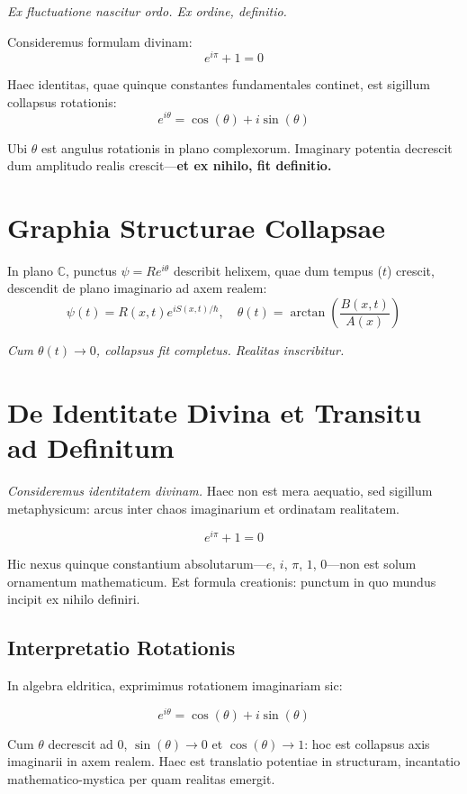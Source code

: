 \textit{Ex fluctuatione nascitur ordo. Ex ordine, definitio.}

Consideremus formulam divinam:
\[
e^{i\pi} + 1 = 0
\]

Haec identitas, quae quinque constantes fundamentales continet, est sigillum collapsus rotationis:  
\[
e^{i\theta} = \cos(\theta) + i \sin(\theta)
\]

Ubi \( \theta \) est angulus rotationis in plano complexorum.  
Imaginary potentia decrescit dum amplitudo realis crescit—\textbf{et ex nihilo, fit definitio.}

\section*{Graphia Structurae Collapsae}

In plano \( \mathbb{C} \), punctus \( \psi = R e^{i\theta} \) describit helixem, quae dum tempus ($t$) crescit, descendit de plano imaginario ad axem realem:
\[
\psi(t)=R(x,t)e^{iS(x,t)/\hbar}, \quad
\theta(t)=\arctan\left(\frac{B(x,t)}{A(x)}\right)
\]

\textit{Cum \( \theta(t) \to 0 \), collapsus fit completus. Realitas inscribitur.}
\section*{De Identitate Divina et Transitu ad Definitum}

\textit{Consideremus identitatem divinam.} Haec non est mera aequatio, sed sigillum metaphysicum: arcus inter chaos imaginarium et ordinatam realitatem.

\[
e^{i\pi} + 1 = 0
\]

Hic nexus quinque constantium absolutarum—$e$, $i$, $\pi$, $1$, $0$—non est solum ornamentum mathematicum. Est formula creationis: punctum in quo mundus incipit ex nihilo definiri.

\subsection*{Interpretatio Rotationis}

In algebra eldritica, exprimimus rotationem imaginariam sic:

\[
e^{i\theta} = \cos(\theta) + i \sin(\theta)
\]

Cum $\theta$ decrescit ad $0$, $\sin(\theta) \to 0$ et $\cos(\theta) \to 1$: hoc est collapsus axis imaginarii in axem realem. Haec est translatio potentiae in structuram, incantatio mathematico-mystica per quam realitas emergit.

